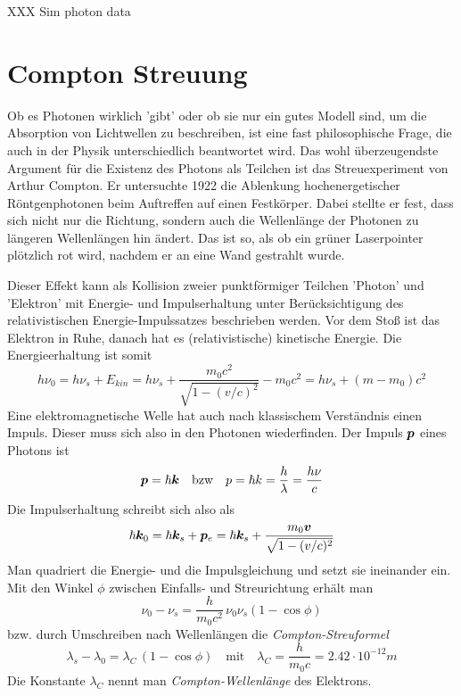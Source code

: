 XXX Sim photon data

 \section{Compton Streuung}

 Ob es Photonen wirklich 'gibt' oder ob sie nur ein gutes Modell sind, um die Absorption von Lichtwellen zu beschreiben, ist eine fast philosophische Frage, die auch in der Physik unterschiedlich beantwortet wird. Das wohl überzeugendste Argument für die Existenz des Photons als Teilchen ist das Streuexperiment von Arthur Compton. Er untersuchte 1922 die Ablenkung hochenergetischer Röntgenphotonen beim Auftreffen auf einen Festkörper. Dabei stellte er fest, dass sich nicht nur die Richtung, sondern auch die Wellenlänge der Photonen zu längeren Wellenlängen hin ändert. Das ist so, als ob ein grüner Laserpointer plötzlich rot wird, nachdem er an eine Wand gestrahlt wurde.

 Dieser Effekt kann als Kollision zweier punktförmiger Teilchen 'Photon' und 'Elektron' mit Energie- und Impulserhaltung unter Berücksichtigung des relativistischen Energie-Impulssatzes beschrieben werden. Vor dem Stoß ist das Elektron in Ruhe, danach hat es (relativistische) kinetische Energie. Die Energieerhaltung ist somit
\begin{equation}
    h \nu_0 = h \nu_s + E_{kin} = h \nu_s + \frac{m_0 c^2}{\sqrt{1 - (v/c)^2}} - m_0 c^2 = h \nu_s + (m - m_0) c^2
\end{equation}
Eine elektromagnetische Welle hat auch nach klassischem Verständnis einen Impuls. Dieser muss sich also in den Photonen wiederfinden. Der Impuls $\boldsymbol{p}$ eines Photons ist 
\begin{equation}
    \boldsymbol{p} = \hbar \boldsymbol{k} \quad \text{bzw} \quad p = \hbar k = \frac{h}{\lambda} = \frac{h \nu}{c}
    \label{eq:2_impuls_photon}
\end{equation}
Die Impulserhaltung schreibt sich also als
\begin{equation}
    \hbar \boldsymbol{k}_0 = \hbar \boldsymbol{k}_s + \boldsymbol{p}_e = \hbar \boldsymbol{k}_s + \frac{m_0 \boldsymbol{v}}{\sqrt{1 - (v/c)^2}}
\end{equation}
Man quadriert die Energie- und die Impulsgleichung und setzt sie ineinander ein. Mit den Winkel $\phi$ zwischen Einfalls- und Streurichtung erhält man
\begin{equation}
    \nu_0 - \nu_s = \frac{h}{m_0 c^2} \, \nu_0 \nu_s (1 - \cos \phi)
\end{equation}
bzw. durch Umschreiben nach Wellenlängen die \emph{Compton-Streuformel}
\begin{equation}
    \lambda_s - \lambda_0 =  \lambda_C \, (1 - \cos \phi) \quad \text{mit} \quad
    \lambda_C = \frac{h}{m_0 c} = 2.42 \cdot 10^{-12} m
\end{equation}
Die Konstante $\lambda_C$ nennt man \emph{Compton-Wellenlänge} des Elektrons.

